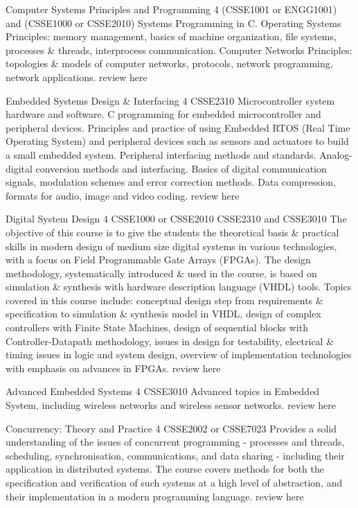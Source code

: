 	{Computer Systems Principles and Programming}
	{4}
	{(CSSE1001 or ENGG1001) and (CSSE1000 or CSSE2010)}
	{}
	{}
	{Systems Programming in C. Operating Systems Principles: memory management, basics of machine organization, file systems, processes \& threads, interprocess communication. Computer Networks Principles: topologies \& models of computer networks, protocols, network programming, network applications.}
	{review here}

	{Embedded Systems Design \& Interfacing}
	{4}
	{CSSE2310}
	{}
	{}
	{Microcontroller system hardware and software. C programming for embedded microcontroller and peripheral devices. Principles and practice of using Embedded RTOS (Real Time Operating System) and peripheral devices such as sensors and actuators to build a small embedded system. Peripheral interfacing methods and standards. Analog-digital conversion methods and interfacing. Basics of digital communication signals, modulation schemes and error correction methods. Data compression, formats for audio, image and video coding.}
	{review here}

	{Digital System Design}
	{4}
	{CSSE1000 or CSSE2010}
	{CSSE2310 and CSSE3010}
	{}
	{The objective of this course is to give the students the theoretical basis \& practical skills in modern design of medium size digital systems in various technologies, with a focus on Field Programmable Gate Arrays (FPGAs). The design methodology, systematically introduced \& used in the course, is based on simulation \& synthesis with hardware description language (VHDL) tools. Topics covered in this course include: conceptual design step from requirements \& specification to simulation \& synthesis model in VHDL, design of complex controllers with Finite State Machines, design of sequential blocks with Controller-Datapath methodology, issues in design for testability, electrical \& timing issues in logic and system design, overview of implementation technologies with emphasis on advances in FPGAs.}
	{review here}

	{Advanced Embedded Systems}
	{4}
	{CSSE3010}
	{}
	{}
	{Advanced topics in Embedded System, including wireless networks and wireless sensor networks.}
	{review here}

	{Concurrency: Theory and Practice}
	{4}
	{CSSE2002 or CSSE7023}
	{}
	{}
	{Provides a solid understanding of the issues of concurrent programming - processes and threads, scheduling, synchronisation, communications, and data sharing - including their application in distributed systems. The course covers methods for both the specification and verification of such systems at a high level of abstraction, and their implementation in a modern programming language.}
	{review here}

